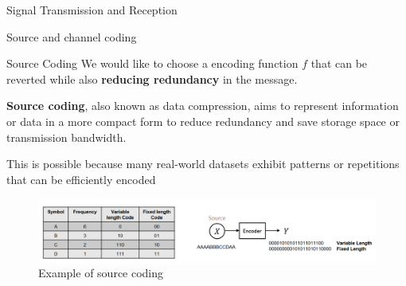\begin{section}{Signal Transmission and Reception}
\begin{section}{Source and channel coding}
    \begin{subsection}{Source Coding}
      We would like to choose a encoding function $f$ that can be reverted while also \textbf{reducing
        redundancy} in the message.\\
        \begin{boxH}
          \textbf{Source coding}, also known as data compression, aims to represent information or
          data in a more compact form to reduce redundancy and save storage space or transmission 
          bandwidth.
        \end{boxH}
        This is possible because many real-world datasets exhibit patterns or repetitions that can 
        be efficiently encoded

        \begin{figure}[h]
          \centering
          \includegraphics[width=\textwidth]{img/wireless/source coding.png}
          \caption{Example of source coding}
          \label{fig:source coding}
        \end{figure}


\end{subsection}
\end{section}
\end{section}
